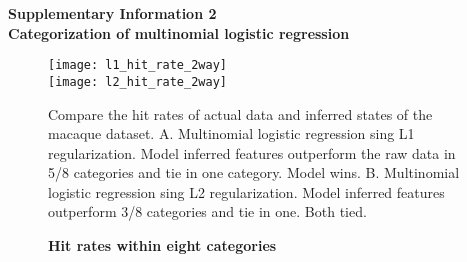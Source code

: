 
\begin{flushleft}
{\Large
\textbf{Supplementary Information 2 \\ Categorization of multinomial logistic regression \\}
}
\end{flushleft}

\begin{figure}[!h]
    \texttt{[image: l1\_hit\_rate\_2way]}\\
    \texttt{[image: l2\_hit\_rate\_2way]}
	\caption{\bf Hit rates within eight categories} Compare the hit rates of actual data and inferred states of the macaque dataset. A. Multinomial logistic regression sing L1 regularization. Model inferred features outperform the raw data in 5/8 categories and tie in one category. Model wins. B. Multinomial logistic regression sing L2 regularization. Model inferred features outperform 3/8 categories and tie in one. Both tied.
	\label{fig:softmax}
\end{figure}
